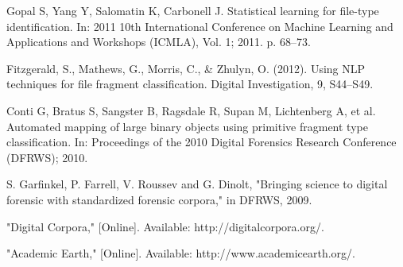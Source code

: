 Gopal S, Yang Y, Salomatin K, Carbonell J. Statistical learning for file-type identification. In: 2011 10th International Conference on Machine Learning and Applications and Workshops (ICMLA), Vol. 1; 2011. p. 68–73.

Fitzgerald, S., Mathews, G., Morris, C., \& Zhulyn, O. (2012). Using NLP techniques for file fragment classification. Digital Investigation, 9, S44–S49.

Conti G, Bratus S, Sangster B, Ragsdale R, Supan M, Lichtenberg A, et al. Automated mapping of large binary objects using primitive fragment type classification. In: Proceedings of the 2010 Digital Forensics Research Conference (DFRWS); 2010.

S. Garfinkel, P. Farrell, V. Roussev and G. Dinolt, "Bringing science to digital forensic with standardized forensic corpora," in DFRWS, 2009.

"Digital Corpora," [Online]. Available: http://digitalcorpora.org/.

"Academic Earth," [Online]. Available: http://www.academicearth.org/.
